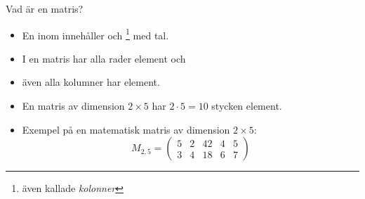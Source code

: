 

\begin{Slide}{Vad är en matris?}\SlideFontSmall
\begin{itemize}

\item En  inom  innehåller  och \footnote{även kallade \emph{kolonner}} med tal.

\item I en  matris har alla rader  element och

\item även alla kolumner har  element.

\item En matris av dimension $2\times{}5$ har $2 \cdot 5 = 10$ stycken element.

\item Exempel på en matematisk matris av dimension $2\times{}5$:
\[
M_{2,5}=
  \begin{pmatrix}
    5 & 2 & 42 & 4 & 5 \\
    3 & 4 & 18 & 6 & 7
  \end{pmatrix}
\]
\end{itemize}
\end{Slide}

